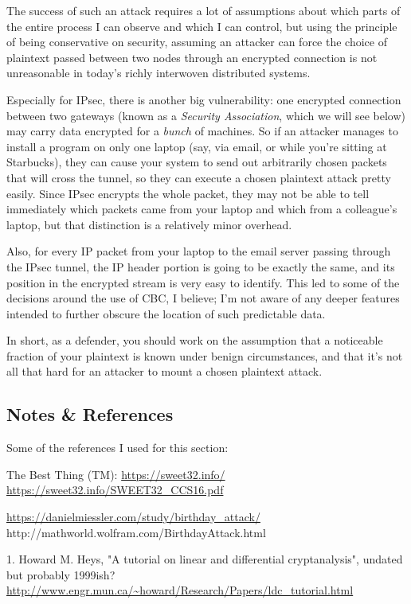 \documentclass[%
 aip,
 jmp,%
 amsmath,amssymb,
 reprint,%
]{revtex4-1}
\begin{document}
The success of such an attack requires a lot of assumptions about
which parts of the entire process I can observe and which I can
control, but using the principle of being conservative on security,
assuming an attacker can force the choice of plaintext passed between
two nodes through an encrypted connection is not unreasonable in
today's richly interwoven distributed systems.

Especially for IPsec, there is another big vulnerability: one
encrypted connection between two gateways (known as a \emph{Security
Association}, which we will see below) may carry data encrypted for a
\emph{bunch} of machines.  So if an attacker manages to install a program
on only one laptop (say, via email, or while you're sitting at
Starbucks), they can cause your system to send out arbitrarily chosen
packets that will cross the tunnel, so they can execute a chosen
plaintext attack pretty easily.  Since IPsec encrypts the whole
packet, they may not be able to tell immediately which packets came
from your laptop and which from a colleague's laptop, but that
distinction is a relatively minor overhead.

Also, for every IP packet from your laptop to the email server passing
through the IPsec tunnel, the IP header portion is going to be exactly
the same, and its position in the encrypted stream is very easy to
identify.  This led to some of the decisions around the use of CBC, I
believe; I'm not aware of any deeper features intended to further
obscure the location of such predictable data.

In short, as a defender, you should work on the assumption that a
noticeable fraction of your plaintext is known under benign
circumstances, and that it's not all that hard for an attacker to
mount a chosen plaintext attack.

\subsection{Notes \& References}

Some of the references I used for this section:

The Best Thing (TM):
\url{https://sweet32.info/}
\url{https://sweet32.info/SWEET32_CCS16.pdf}

\url{https://danielmiessler.com/study/birthday_attack/}
http://mathworld.wolfram.com/BirthdayAttack.html

1. Howard M. Heys, "A tutorial on linear and differential
cryptanalysis", undated but probably 1999ish?
\url{http://www.engr.mun.ca/~howard/Research/Papers/ldc_tutorial.html}
\end{document}
